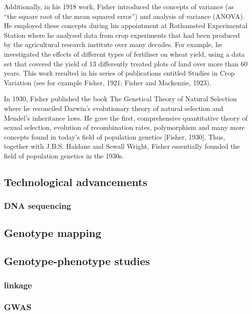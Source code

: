 Additionally, in his 1918 work, Fisher introduced the concepts of variance (as “the square root of the mean squared error”) and analysis of variance (ANOVA). 
He employed these concepts during his appointment at Rothamsted Experimental Station where he analysed data from crop experiments that had been produced by the agricultural research institute over many decades.
For example, he investigated the effects of different types of fertiliser on wheat yield, using a data set that covered the yield of 13 differently treated plots of land over more than 60 years. 
This work resulted in his series of publications entitled Studies in Crop Variation (see for example Fisher, 1921; Fisher and Mackenzie, 1923). 

In 1930, Fisher published the book The Genetical Theory of Natural Selection where he reconciled Darwin’s evolutionary theory of natural selection and Mendel’s inheritance laws. 
He gave the first, comprehensive quantitative theory of sexual selection, evolution of recombination rates, polymorphism and many more concepts found in today’s field of population genetics [Fisher, 1930]. 
Thus, together with J.B.S. Haldane and Sewall Wright, Fisher essentially founded the field of population genetics in the 1930s.\\

\subsection{Technological advancements}
\subsubsection{DNA sequencing}
\subsection{Genotype mapping}

\subsection{Genotype-phenotype studies}
\subsubsection{linkage}
\subsubsection{GWAS}

